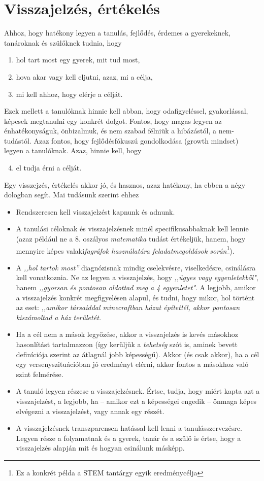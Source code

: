 \section{Visszajelzés, értékelés}
\label{sec:ertekeles}
Ahhoz, hogy hatékony legyen a tanulás, fejlődés, érdemes a gyerekeknek, tanároknak és szülőknek tudnia, hogy
\begin{enumerate}
\item hol tart most egy gyerek, mit tud most,
\item hova akar vagy kell eljutni, azaz, mi a célja,
\item mi kell ahhoz, hogy elérje a célját.
\end{enumerate}
Ezek mellett a tanulóknak hinnie kell abban, hogy odafigyeléssel, gyakorlással, képesek megtanulni egy konkrét dolgot. Fontos, hogy magas legyen az énhatékonyságuk, önbizalmuk, és nem szabad félniük a hibázástól, a nem-tudástól. Azaz fontos, hogy fejlődésfókuszú gondolkodása (growth mindset)\cite{growthmindset} legyen a tanulóknak. Azaz, hinnie kell, hogy
\begin{enumerate}
  \setcounter{enumi}{3}
  \item el tudja érni a célját.
\end{enumerate}

Egy visszejzés, értékelés akkor jó, és hasznos, azaz hatékony, ha ebben a négy dologban segít. Mai tudásunk szerint ehhez
\begin{itemize}
\item Rendszeresen kell visszajelzést kapnunk és adnunk.
\item A tanulási céloknak és visszajelzésnek minél specifikusabbaknak kell lennie (azaz például ne a 8. oszályos \emph{matematika} tudást értékeljük, hanem, hogy mennyire képes valaki\emph{fagráfok használatára feladatmegoldások során}\footnote{Ez a konkrét példa a STEM tantárgy egyik eredménycélja}).
\item A \emph{,,hol tartok most''} diagnózisnak mindig cselekvésre, viselkedésre, csinálásra kell vonatkoznia. Ne az legyen a visszajelzés, hogy \emph{,,ügyes vagy egyenletekből"}, hanem \emph{,,gyorsan és pontosan oldottad meg a 4 egyenletet"}. A legjobb, amikor a visszajelzés konkrét megfigyelésen alapul, és tudni, hogy mikor, hol történt az eset: \emph{,,amikor társaiddal minecraftban házat építettél, akkor pontosan kiszámoltad a ház területét.}
\item Ha a cél nem a mások legyőzése, akkor a visszajelzés is kevés másokhoz hasonlítást tartalmazzon (így kerüljük a \emph{tehetség} szót is, aminek bevett definíciója szerint az átlagnál jobb képességű). Akkor (és csak akkor), ha a cél egy versenyszituációban jó eredményt elérni, akkor fontos a másokhoz való szint felmérése.
\item A tanuló legyen részese a visszajelzésnek. Értse, tudja, hogy miért kapta azt a visszajelzést, a legjobb, ha -- amikor ezt a képességei engedik -- önmaga képes elvégezni a visszajelzést, vagy annak egy részét.
\item A visszajelzésnek transzparensen hatással kell lenni a tanulásszervezésre. Legyen része a folyamatnak és a gyerek, tanár és a szülő is értse, hogy a visszajelzés alapján mit és hogyan csinálunk másképp.
\end{itemize}

